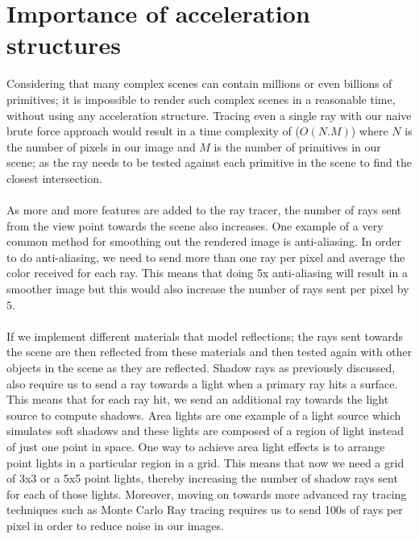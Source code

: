 \documentclass[11pt,a4paper]{article}
\begin{document}
\section{Importance of acceleration structures}
Considering that many complex scenes can contain millions or even billions of primitives; it is impossible to render such complex scenes in a reasonable time, without using any acceleration structure. Tracing even a single ray with our naive brute force approach would result in a time complexity of ($O(N.M)$) where $N$ is the number of pixels in our image and $M$ is the number of primitives in our scene; as the ray needs to be tested against each primitive in the scene to find the closest intersection. 
\\~\\
\noindent
As more and more features are added to the ray tracer, the number of rays sent from the view point towards the scene also increases. One example of a very common method for smoothing out the rendered image is anti-aliasing. In order to do anti-aliasing, we need to send more than one ray per pixel and average the color received for each ray. This means that doing 5x anti-aliasing will result in a smoother image but this would also increase the number of rays sent per pixel by $5$. 
\\~\\
\noindent
If we implement different materials that model reflections; the rays sent towards the scene are then reflected from these materials and then tested again with other objects in the scene as they are reflected. Shadow rays as previously discussed, also require us to send a ray towards a light when a primary ray hits a surface. This means that for each ray hit, we send an additional ray towards the light source to compute shadows. Area lights are one example of a light source which simulates soft shadows and these lights are composed of a region of light instead of just one point in space. One way to achieve area light effects is to arrange point lights in a particular region in a grid. This means that now we need a grid of 3x3 or a 5x5 point lights, thereby increasing the number of shadow rays sent for each of those lights. Moreover, moving on towards more advanced ray tracing techniques such as Monte Carlo Ray tracing requires us to send 100s of rays per pixel in order to reduce noise in our images.
\\~\\
\noindent
\end{document}
